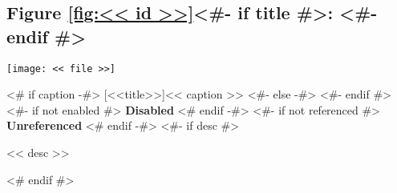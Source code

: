 \begin{samepage}
\subsection{Figure \ref{fig:<< id >>}<#- if title #>: <#- endif #>\hfill%
  \color{light-gray}}
\nopagebreak
\noindent\centerline{\texttt{[image: << file >>]}}
<# if caption -#>
\nopagebreak
{}[<<title>>]{<< caption >>}
<#- else -#>
<#- endif #>\label{fig:<< id >>}
<#- if not enabled #>
{\color{red}\textbf{Disabled}}
<# endif -#>
<#- if not referenced #>
{\color{red}\textbf{Unreferenced}}
<# endif -#>
<#- if desc #>
\nopagebreak
\begin{figinfo}<< desc >>\end{figinfo}
<# endif #>
\end{samepage}
\vspace{20pt}
